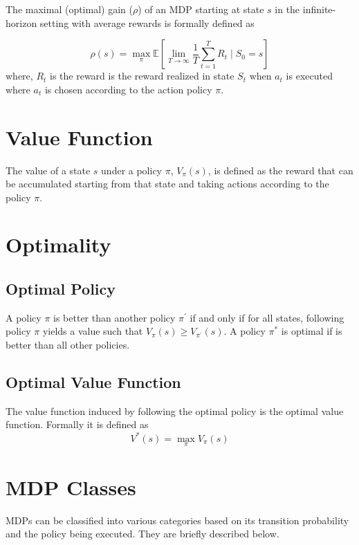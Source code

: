 The maximal (optimal) gain ($\rho$) of an MDP starting at state $s$ in the infinite-horizon setting with average rewards is formally defined as

\begin{equation}
    \label{eqn:gain_opt}
    \rho(s) = \max_\pi \mathbb{E}\left[\lim_{T \to \infty} \frac{1}{T} \sum_{t=1}^{T} R_t \mid S_0 = s\right]
\end{equation}
where, $R_t$ is the reward is the reward realized in state $S_t$ when $a_t$ is executed where $a_t$ is chosen according to the action policy $\pi$.

\section{Value Function}

The value of a state $s$ under a policy $\pi$, $V_\pi(s)$, is defined as the reward that can be accumulated starting from that state and taking actions according to the policy $\pi$. 

\section{Optimality}

\subsection{Optimal Policy}

A policy $\pi$ is better than another policy $\pi^\prime$ if and only if for all states, following policy $\pi$ yields a value such that $V_\pi(s) \ge V_{\pi^\prime} (s)$.
A policy $\pi^*$ is optimal if is better than all other policies.

\subsection{Optimal Value Function}

The value function induced by following the optimal policy is the optimal value function. Formally it is defined as
$$V^*(s) = \max_\pi V_\pi(s)$$

\section{MDP Classes}

MDPs can be classified into various categories based on its transition probability and the policy being executed. They are briefly described below.

